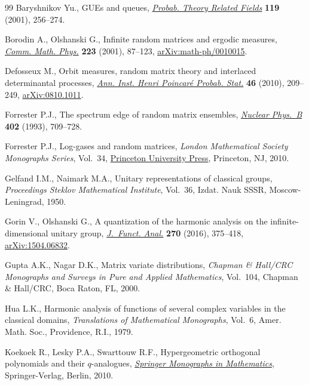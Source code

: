 \documentclass[11pt]{article}
\numberwithin{equation}{section}
\begin{document}
\begin{thebibliography}{99}
Baryshnikov Yu., G{UE}s and queues, \href{https://doi.org/10.1007/PL00008760}{\textit{Probab. Theory Related Fields}}
 \textbf{119} (2001), 256--274.

Borodin A., Olshanski G., Infinite random matrices and ergodic measures,
 \href{https://doi.org/10.1007/s002200100529}{\textit{Comm. Math. Phys.}} \textbf{223} (2001), 87--123,
 \href{https://arxiv.org/abs/math-ph/0010015}{arXiv:math-ph/0010015}.

Defosseux M., Orbit measures, random matrix theory and interlaced determinantal
 processes, \href{https://doi.org/10.1214/09-AIHP314}{\textit{Ann. Inst. Henri Poincar\'{e} Probab. Stat.}} \textbf{46}
 (2010), 209--249, \href{https://arxiv.org/abs/0810.1011}{arXiv:0810.1011}.

Forrester P.J., The spectrum edge of random matrix ensembles, \href{https://doi.org/10.1016/0550-3213(93)90126-A}{\textit{Nuclear
 Phys.~B}} \textbf{402} (1993), 709--728.

Forrester P.J., Log-gases and random matrices, \textit{London Mathematical
 Society Monographs Series}, Vol.~34, \href{https://doi.org/10.1515/9781400835416}{Princeton University Press}, Princeton,
 NJ, 2010.

Gelfand I.M., Naimark M.A., Unitary representations of classical groups,
 \textit{Proceedings Steklov Mathematical Institute}, Vol.~36, Izdat. Nauk
 SSSR, Moscow-Leningrad, 1950.

Gorin V., Olshanski G., A quantization of the harmonic analysis on the
 infinite-dimensional unitary group, \href{https://doi.org/10.1016/j.jfa.2015.06.006}{\textit{J.~Funct. Anal.}} \textbf{270}
 (2016), 375--418, \href{https://arxiv.org/abs/1504.06832}{arXiv:1504.06832}.

Gupta A.K., Nagar D.K., Matrix variate distributions, \textit{Chapman \&
 Hall/CRC Monographs and Surveys in Pure and Applied Mathematics}, Vol.~104,
 Chapman \& Hall/CRC, Boca Raton, FL, 2000.

Hua L.K., Harmonic analysis of functions of several complex variables in the
 classical domains, \textit{Translations of Mathematical Monographs}, Vol.~6,
 Amer. Math. Soc., Providence, R.I., 1979.

Koekoek R., Lesky P.A., Swarttouw R.F., Hypergeometric orthogonal polynomials
 and their {$q$}-analogues, \href{https://doi.org/10.1007/978-3-642-05014-5}{\textit{Springer Monographs in Mathematics}},
 Springer-Verlag, Berlin, 2010.


\end{thebibliography}
\end{document}
